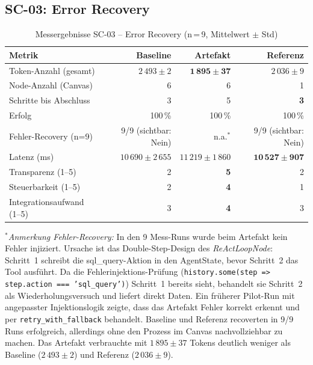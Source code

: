 \documentclass[12pt,a4paper,oneside]{report}
\begin{document}
\subsection{SC-03: Error Recovery}

\begin{table}[H]
  \centering
  \caption{Messergebnisse SC-03 -- Error Recovery (n\,=\,9, Mittelwert $\pm$ Std)}
  \label{tab:results-sc03}
  \begin{tabular}{lrrr}
    \toprule
    \textbf{Metrik} & \textbf{Baseline} & \textbf{Artefakt} & \textbf{Referenz} \\
    \midrule
    Token-Anzahl (gesamt)      & $2\,493 \pm 2$           & $\mathbf{1\,895 \pm 37}$  & $2\,036 \pm 9$ \\
    Node-Anzahl (Canvas)       & 6                        & 6                         & 1 \\
    Schritte bis Abschluss     & 3                        & 5                         & \textbf{3} \\
    Erfolg                     & 100\,\%                  & 100\,\%                   & 100\,\% \\
    Fehler-Recovery (n=9)      & 9/9 (sichtbar: Nein)     & n.a.$^{*}$                & 9/9 (sichtbar: Nein) \\
    Latenz (ms)                & $10\,690 \pm 2\,655$     & $11\,219 \pm 1\,860$      & $\mathbf{10\,527 \pm 907}$ \\
    Transparenz (1--5)         & 2                        & \textbf{5}                & 2 \\
    Steuerbarkeit (1--5)       & 2                        & \textbf{4}                & 1 \\
    Integrationsaufwand (1--5) & 3                        & \textbf{4}                & 3 \\
    \bottomrule
  \end{tabular}
\end{table}

\noindent$^{*}$\textit{Anmerkung Fehler-Recovery:} In den 9 Mess-Runs wurde beim
Artefakt kein Fehler injiziert. Ursache ist das Double-Step-Design des
\textit{ReActLoopNode}: Schritt~1 schreibt die sql\_query-Aktion in den AgentState,
bevor Schritt~2 das Tool ausführt. Da die Fehlerinjektions-Prüfung
(\texttt{history.some(step => step.action === 'sql\_query')}) Schritt~1 bereits sieht,
behandelt sie Schritt~2 als Wiederholungsversuch und liefert direkt Daten. Ein früherer
Pilot-Run mit angepasster Injektionslogik zeigte, dass das Artefakt Fehler korrekt
erkennt und per \texttt{retry\_with\_fallback} behandelt. Baseline und Referenz
recoverten in 9/9 Runs erfolgreich, allerdings ohne den Prozess im Canvas
nachvollziehbar zu machen. Das Artefakt verbrauchte mit $1\,895 \pm 37$ Tokens
deutlich weniger als Baseline ($2\,493 \pm 2$) und Referenz ($2\,036 \pm 9$).
\end{document}
